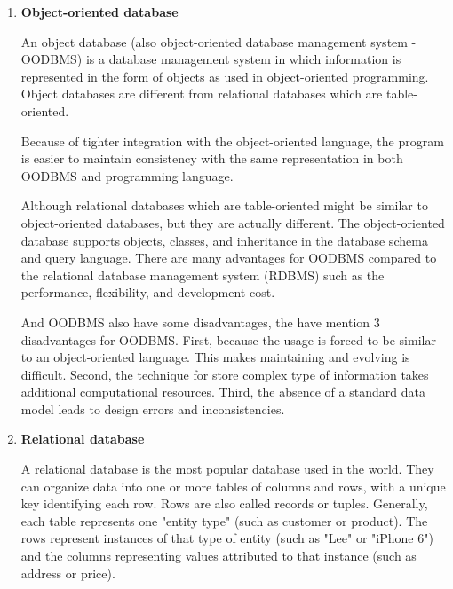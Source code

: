 \begin{enumerate}
	\item\textbf{Object-oriented database}
	\setlength{\parindent}{1em}
	
	
	An object database (also object-oriented database management system - OODBMS) is a database management system in which information is represented in the form of objects as used in object-oriented programming. Object databases are different from relational databases which are table-oriented.
	
	Because of tighter integration with the object-oriented language, the program is easier to maintain consistency with the same representation in both OODBMS and programming language.
	
	Although relational databases which are table-oriented might be similar to object-oriented databases, but they are actually different. The object-oriented database supports objects, classes, and inheritance in the database schema and query language.
	There are many advantages for OODBMS compared to the relational database management system (RDBMS) such as the performance, flexibility, and development cost.
	
	And OODBMS also have some disadvantages, the have mention 3 disadvantages for OODBMS. First, because the usage is forced to be similar to an object-oriented language. This makes maintaining and evolving is difficult. Second, the technique for store complex type of information takes additional computational resources. Third, the absence of a standard data model leads to design errors and inconsistencies.
	
	
	\item\textbf{Relational database}
	\setlength{\parindent}{1em}
	
	A relational database is the most popular database used in the world. They can organize data into one or more tables of columns and rows, with a unique key identifying each row. Rows are also called records or tuples. Generally, each table represents one "entity type" (such as customer or product). The rows represent instances of that type of entity (such as "Lee" or "iPhone 6") and the columns representing values attributed to that instance (such as address or price).
	

\end{enumerate}
